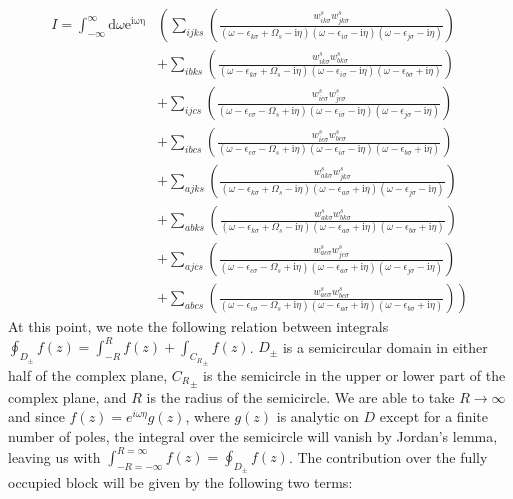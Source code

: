 \documentclass[12pt]{article}
\begin{document}
\begin{equation}
\begin{aligned}
I = \int_{-\infty }^{\infty }\mathrm{d} \omega \mathrm{e}^{\mathrm{i \omega \eta}} 
& \left( \sum_{ijks} \left( \frac{w_{i k \sigma}^s w_{j k \sigma}^s}{(\omega-\epsilon_{k \sigma}+\Omega_s-\mathrm{i} \eta)(\omega-\epsilon_{i \sigma}-\mathrm{i} \eta)(\omega-\epsilon_{j \sigma}-\mathrm{i} \eta)} \right) \right.\\
& \left. + \sum_{ibks} \left( \frac{w_{i k \sigma}^s w_{b k \sigma}^s}{(\omega-\epsilon_{k \sigma}+\Omega_s-\mathrm{i} \eta)(\omega-\epsilon_{i \sigma}-\mathrm{i} \eta)(\omega-\epsilon_{b \sigma}+\mathrm{i} \eta)} \right) \right.\\
& \left. + \sum_{ijcs} \left( \frac{w_{i c \sigma}^s w_{j c \sigma}^s}{(\omega-\epsilon_{c \sigma}-\Omega_s+\mathrm{i} \eta)(\omega-\epsilon_{i \sigma}-\mathrm{i} \eta)(\omega-\epsilon_{j \sigma}-\mathrm{i} \eta)} \right) \right.\\
& \left. + \sum_{ibcs} \left( \frac{w_{i c \sigma}^s w_{b c \sigma}^s}{(\omega-\epsilon_{c \sigma}-\Omega_s+\mathrm{i} \eta)(\omega-\epsilon_{i \sigma}-\mathrm{i} \eta)(\omega-\epsilon_{b \sigma}+\mathrm{i} \eta)} \right) \right. \\
& \left. + \sum_{ajks} \left( \frac{w_{a k \sigma}^s w_{j k \sigma}^s}{(\omega-\epsilon_{k \sigma}+\Omega_s-\mathrm{i} \eta)(\omega-\epsilon_{a \sigma}+\mathrm{i} \eta)(\omega-\epsilon_{j \sigma}-\mathrm{i} \eta)} \right) \right.\\
& \left. + \sum_{abks} \left( \frac{w_{a k \sigma}^s w_{b k \sigma}^s}{(\omega-\epsilon_{k \sigma}+\Omega_s-\mathrm{i} \eta)(\omega-\epsilon_{a \sigma}+\mathrm{i} \eta)(\omega-\epsilon_{b \sigma}+\mathrm{i} \eta)} \right) \right.\\
& \left. + \sum_{ajcs} \left( \frac{w_{a c \sigma}^s w_{j c \sigma}^s}{(\omega-\epsilon_{c \sigma}-\Omega_s+\mathrm{i} \eta)(\omega-\epsilon_{a \sigma}+\mathrm{i} \eta)(\omega-\epsilon_{j \sigma}-\mathrm{i} \eta)} \right) \right.\\
& \left. + \sum_{abcs} \left( \frac{w_{a c \sigma}^s w_{b c \sigma}^s}{(\omega-\epsilon_{c \sigma}-\Omega_s+\mathrm{i} \eta)(\omega-\epsilon_{a \sigma}+\mathrm{i} \eta)(\omega-\epsilon_{b \sigma}+\mathrm{i} \eta)} \right) \right)
\end{aligned}
\label{eqn:long_integral}
\end{equation}
At this point, we note the following relation between integrals $\oint_{D_{\pm}} f(z) = \int_{-R}^R f(z) + \int_{{C_R}_{\pm}} f(z)$. $D_{\pm}$ is a semicircular domain in either half of the complex plane, ${C_R}_{\pm}$ is the semicircle in the upper or lower part of the complex plane, and $R$ is the radius of the semicircle. We are able to take $R\rightarrow \infty$ and since $f(z)=e^{i\omega \eta}g(z)$, where $g(z)$ is analytic on $D$ except for a finite number of poles, the integral over the semicircle will vanish by Jordan's lemma, leaving us with $\int_{-R=-\infty}^{R=\infty} f(z)= \oint_{D_{\pm}} f(z)$. The contribution over the fully occupied block will be given by the following two terms:
\end{document}
